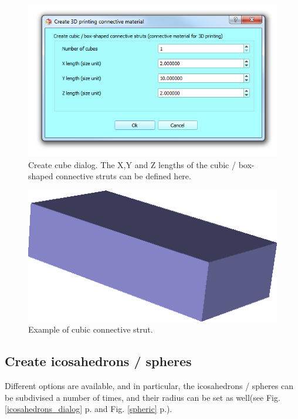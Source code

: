 \begin{figure}
  \centering
  \includegraphics[scale=0.5]{images/09/create_3D_primitives/cubes_dialog.png} 
	\caption{Create cube dialog. The X,Y and Z lengths of the cubic / box-shaped connective struts can be defined here.}
 \label{cubes_dialog}
\end{figure}

\begin{figure}
  \centering
  \includegraphics[scale=0.5]{images/09/create_3D_primitives/cubic.png} 
	\caption{Example of cubic connective strut.}
 \label{cubic}
\end{figure}

\subsection{Create icosahedrons / spheres}
Different options are available, and in particular, the icosahedrons / spheres can be subdivised a number of times, and their radius can be set as well(see Fig.  \ref{icosahedrons_dialog} p.\pageref{icosahedrons_dialog} and Fig. \ref{spheric} p.\pageref{spheric}). 

